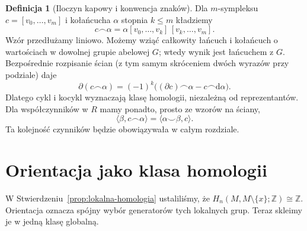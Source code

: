 \documentclass[11pt,a4paper,oneside]{report}
\newcommand{\Z}{\mathbb{Z}}
\newcommand{\dd}{\mathrm d}
\theoremstyle{plain}
\theoremstyle{definition}
\newtheorem{definicja}[twierdzenie]{Definicja}
\theoremstyle{remark}
\begin{document}
\begin{definicja}[Iloczyn kapowy i konwencja znaków]
\label{def:kapowy-16}
Dla $m$-sympleksu $c=[v_0,\ldots,v_m]$ i kołańcucha
$\alpha$ stopnia $k\leq m$ kładziemy
\[
 c\frown\alpha=\alpha[v_0,\ldots,v_k]\,[v_k,\ldots,v_m].
\]
Wzór przedłużamy liniowo. Możemy wziąć całkowity łańcuch
i kołańcuch o wartościach w dowolnej grupie abelowej $G$;
wtedy wynik jest łańcuchem z $G$. Bezpośrednie rozpisanie
ścian (z tym samym skróceniem dwóch wyrazów przy podziale)
daje
\begin{equation}\label{eq:kapowy-brzeg-16}
 \partial(c\frown\alpha)=(-1)^k
  \bigl((\partial c)\frown\alpha-c\frown\dd\alpha\bigr).
\end{equation}
Dlatego cykl i kocykl wyznaczają klasę homologii,
niezależną od reprezentantów. Dla współczynników w $R$
mamy ponadto, prosto ze wzorów na ściany,
\[
 \langle\beta,c\frown\alpha\rangle
 =\langle\alpha\smile\beta,c\rangle.
\]
Ta kolejność czynników będzie obowiązywała w całym rozdziale.
\end{definicja}

\section{Orientacja jako klasa homologii}
\label{sec:klasa-fundamentalna-16}

W Stwierdzeniu~\ref{prop:lokalna-homologia}
ustaliliśmy, że
$H_n(M,M\setminus\{x\};\Z)\cong\Z$.
Orientacja oznacza spójny wybór
generatorów tych lokalnych grup.
Teraz skleimy je w jedną klasę
globalną.
\end{document}

